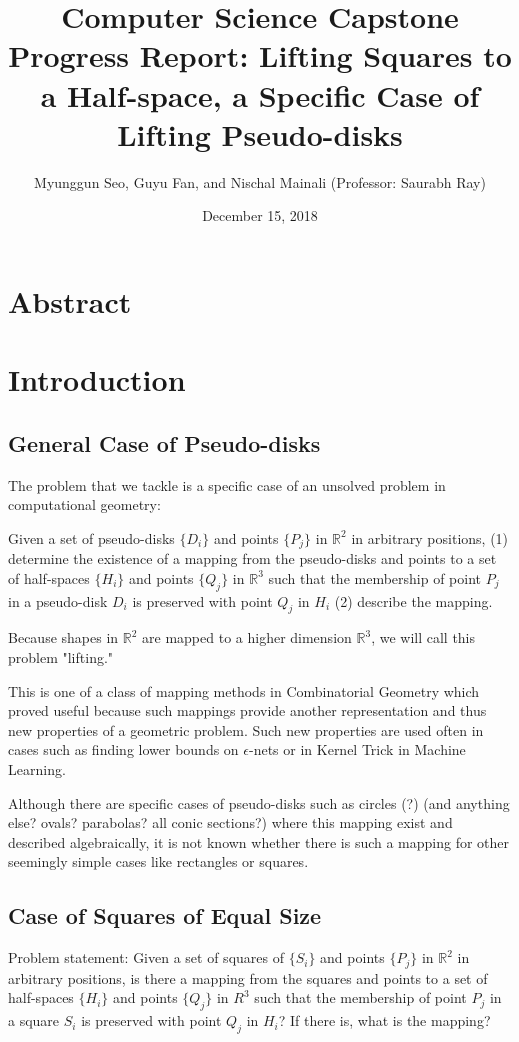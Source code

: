 \documentclass{NSF}
\begin{document}
\author{Myunggun Seo,  Guyu Fan, and Nischal Mainali (Professor: Saurabh Ray)}
\date{December 15, 2018}
\title{Computer Science Capstone Progress Report: Lifting Squares to a Half-space, a Specific Case of Lifting Pseudo-disks}
{\let\newpage\relax\maketitle}

\section{Abstract}

\tableofcontents

\section{Introduction}
\subsection{General Case of Pseudo-disks}
The problem that we tackle is a specific case of an unsolved problem in computational geometry: 

Given a set of pseudo-disks $\{D_i\}$ and points $\{P_j\}$ in $\mathbb{R}^2$ in arbitrary positions, (1) determine the existence of a mapping from the pseudo-disks and points to a set of half-spaces $\{H_i\}$ and points $\{Q_j\}$ in $\mathbb{R}^3$ such that the membership of point $P_j$ in a pseudo-disk $D_i$ is preserved with point $Q_j$ in $H_i$ (2) describe the mapping. 

Because shapes in $\mathbb{R}^2$ are mapped to a higher dimension $\mathbb{R}^3$, we will call this problem "lifting."

This is one of a class of mapping methods in Combinatorial Geometry which proved useful because such mappings provide another representation and thus new properties of a geometric problem. Such new properties are used often in cases such as finding lower bounds on $\epsilon$-nets or in Kernel Trick in Machine Learning. 

Although there are specific cases of pseudo-disks such as circles (?) (and anything else? ovals? parabolas? all conic sections?) where this mapping exist and described algebraically, it is not known whether there is such a mapping for other seemingly simple cases like rectangles or squares. 

\subsection{Case of Squares of Equal Size}
Problem statement: Given a set of squares of  $\{S_i\}$ and points $\{P_j\}$ in $\mathbb{R}^2$ in arbitrary positions, is there a mapping from the squares and points to a set of half-spaces $\{H_i\}$ and points $\{Q_j\}$ in $R^3$ such that the membership of point $P_j$ in a square $S_i$ is preserved with point $Q_j$ in $H_i$? If there is, what is the mapping? 
\end{document}
